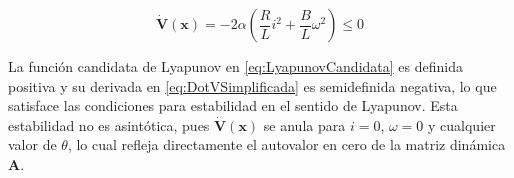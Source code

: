 \begin{equation}
    \mathbf{\dot{V}}(\mathbf{x}) = -2\alpha\left( \frac{R}{L} i^2 + \frac{B}{L} \omega^2 \right) \leq 0
    \label{eq:DotVSimplificada}
\end{equation}

La función candidata de Lyapunov en \eqref{eq:LyapunovCandidata} es definida positiva
y su derivada en \eqref{eq:DotVSimplificada} es semidefinida negativa, lo que
satisface las condiciones para estabilidad en el sentido de Lyapunov. Esta
estabilidad no es asintótica, pues $\mathbf{\dot{V}}(\mathbf{x})$ se anula para
$i=0$, $\omega=0$ y cualquier valor de $\theta$, lo cual refleja directamente
el autovalor en cero de la matriz dinámica $\mathbf{A}$.
